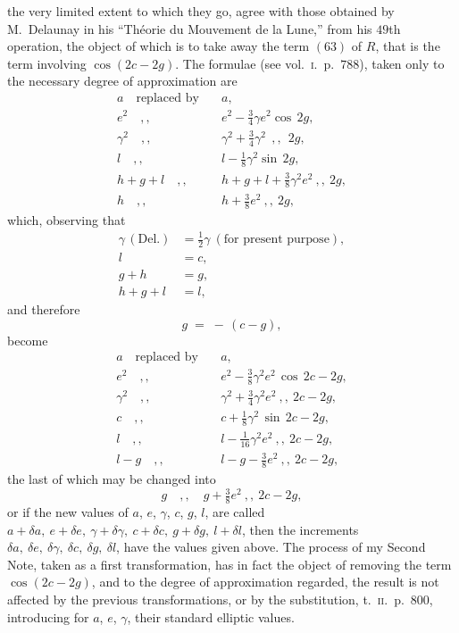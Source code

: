 \documentclass[11pt]{article}
\begin{document}
the very limited extent to which they go, agree with those obtained by
M.\ Delaunay in his ``Th\'eorie du Mouvement de la Lune,'' from his
$49$th operation, the object of which is to take away the term $(63)$
of $R$, that is the term involving $\cos(2c - 2g)$. The formulae (see
vol.\ \textsc{i}.\ p.\ $788$), taken only to the necessary degree of
approximation are
\begin{align*}
a\quad\text{replaced by}\quad & a, \\
e^{2}\quad ,,\quad & e^{2} - \tfrac{3}{4}\gamma e^{2}\cos\,2g, \\
\gamma^{2}\quad ,,\quad & \gamma^{2} + \tfrac{3}{4}\gamma^{2}\ \ ,, \ \ 2g, \\
l\quad ,,\quad & l - \tfrac{1}{8}\gamma^{2}\sin\,2g, \\
h + g + l \quad ,,\quad & h + g + l + \tfrac{3}{8}\gamma^{2}e^{2}\ ,, \ 2g, \\
h\quad ,,\quad & h + \tfrac{3}{8}e^{2}\ ,, \ 2g,
\end{align*}
which, observing that
\begin{align*}
\gamma\,(\text{Del.}) &= \tfrac{1}{2}\gamma\ (\text{for present purpose}), \\
l &= c, \\
g + h &= g, \\
h + g + l &= l,
\end{align*}
and therefore
\[
g \;=\; -\,(c - g),
\]
become
\begin{align*}
a\quad\text{replaced by}\quad & a, \\
e^{2}\quad ,,\quad & e^{2} - \tfrac{3}{8}\gamma^{2}e^{2}\,\cos\,2c - 2g, \\
\gamma^{2}\quad ,,\quad & \gamma^{2} + \tfrac{3}{4}\gamma^{2}e^{2}\ ,, \ 2c - 2g, \\
c\quad ,,\quad & c + \tfrac{1}{8}\gamma^{2}\,\sin\,2c - 2g, \\
l\quad ,,\quad & l - \tfrac{1}{16}\gamma^{2}e^{2}\ ,, \ 2c - 2g, \\
l - g\quad ,,\quad & l - g - \tfrac{3}{8}e^{2}\ ,, \ 2c - 2g,
\end{align*}
the last of which may be changed into
\[
g \quad,,\quad g + \tfrac{3}{8}e^{2}\ ,, \ 2c - 2g,
\]
or if the new values of $a$, $e$, $\gamma$, $c$, $g$, $l$, are called
$a + \delta a,\ e + \delta e,\ \gamma + \delta \gamma,\ c + \delta c,\ g + \delta g,\ l + \delta l$,
then the increments $\delta a,\ \delta e,\ \delta \gamma,\ \delta c,\ \delta g,\ \delta l$,
have the values given above. The process of my Second Note, taken as a
first transformation, has in fact the object of removing the term
$\cos(2c - 2g)$, and to the degree of approximation regarded, the
result is not affected by the previous transformations, or by the
substitution, t.\ \textsc{ii}.\ p.\ $800$, introducing for $a$, $e$,
$\gamma$, their standard elliptic values.
\end{document}
